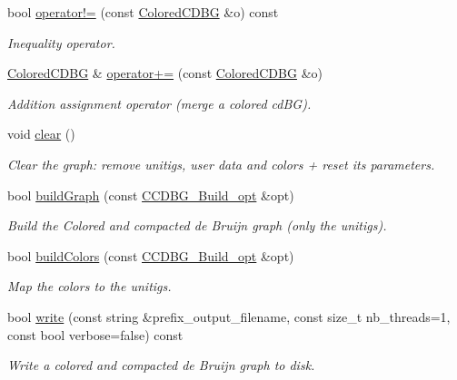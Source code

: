 \begin{DoxyCompactItemize}
bool \hyperlink{classColoredCDBG_a35c67941c16969d13c838e0208b38ede}{operator!=} (const \hyperlink{classColoredCDBG}{Colored\+C\+D\+BG} \&o) const
\begin{DoxyCompactList}\small\item\em Inequality operator. \end{DoxyCompactList}\item 
\hyperlink{classColoredCDBG}{Colored\+C\+D\+BG} \& \hyperlink{classColoredCDBG_a0c88f044938f8dcca4ede2396ceee550}{operator+=} (const \hyperlink{classColoredCDBG}{Colored\+C\+D\+BG} \&o)
\begin{DoxyCompactList}\small\item\em Addition assignment operator (merge a colored cd\+BG). \end{DoxyCompactList}\item 
\mbox{\label{classColoredCDBG_aa366d5e47c978119a20ec9494d3f2ad2}} 
void \hyperlink{classColoredCDBG_aa366d5e47c978119a20ec9494d3f2ad2}{clear} ()
\begin{DoxyCompactList}\small\item\em Clear the graph\+: remove unitigs, user data and colors + reset its parameters. \end{DoxyCompactList}\item 
bool \hyperlink{classColoredCDBG_a7213d0d20b4ee933af43993abf776d43}{build\+Graph} (const \hyperlink{structCCDBG__Build__opt}{C\+C\+D\+B\+G\+\_\+\+Build\+\_\+opt} \&opt)
\begin{DoxyCompactList}\small\item\em Build the Colored and compacted de Bruijn graph (only the unitigs). \end{DoxyCompactList}\item 
bool \hyperlink{classColoredCDBG_af9d50df31f6f82199eb815c43de73a52}{build\+Colors} (const \hyperlink{structCCDBG__Build__opt}{C\+C\+D\+B\+G\+\_\+\+Build\+\_\+opt} \&opt)
\begin{DoxyCompactList}\small\item\em Map the colors to the unitigs. \end{DoxyCompactList}\item 
bool \hyperlink{classColoredCDBG_ae9a3cd0bfa8c72ec2a2e71e6b9f7a0bb}{write} (const string \&prefix\+\_\+output\+\_\+filename, const size\+\_\+t nb\+\_\+threads=1, const bool verbose=false) const
\begin{DoxyCompactList}\small\item\em Write a colored and compacted de Bruijn graph to disk. \end{DoxyCompactList}\item 

\end{DoxyCompactItemize}
